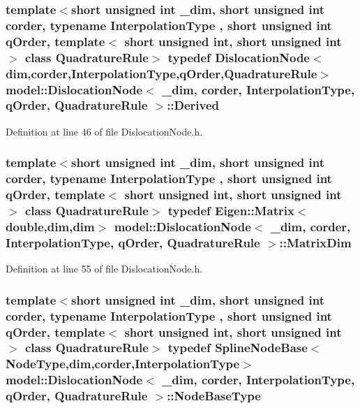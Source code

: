 \subsubsection[{Derived}]{\setlength{\rightskip}{0pt plus 5cm}template$<$short unsigned int \+\_\+dim, short unsigned int corder, typename Interpolation\+Type , short unsigned int q\+Order, template$<$ short unsigned int, short unsigned int $>$ class Quadrature\+Rule$>$ typedef {\bf Dislocation\+Node}$<${\bf dim},corder,Interpolation\+Type,q\+Order,Quadrature\+Rule$>$ {\bf model\+::\+Dislocation\+Node}$<$ \+\_\+dim, corder, Interpolation\+Type, q\+Order, Quadrature\+Rule $>$\+::{\bf Derived}}\label{classmodel_1_1_dislocation_node_a8897d6a9187952a267bb5a539dd69beb}


Definition at line 46 of file Dislocation\+Node.\+h.

\hypertarget{classmodel_1_1_dislocation_node_a7de028e95588e033ed38538bd2e77a51}{}
\subsubsection[{Matrix\+Dim}]{\setlength{\rightskip}{0pt plus 5cm}template$<$short unsigned int \+\_\+dim, short unsigned int corder, typename Interpolation\+Type , short unsigned int q\+Order, template$<$ short unsigned int, short unsigned int $>$ class Quadrature\+Rule$>$ typedef Eigen\+::\+Matrix$<$double,{\bf dim},{\bf dim}$>$ {\bf model\+::\+Dislocation\+Node}$<$ \+\_\+dim, corder, Interpolation\+Type, q\+Order, Quadrature\+Rule $>$\+::{\bf Matrix\+Dim}}\label{classmodel_1_1_dislocation_node_a7de028e95588e033ed38538bd2e77a51}


Definition at line 55 of file Dislocation\+Node.\+h.

\hypertarget{classmodel_1_1_dislocation_node_a1266b6e427448fc1fdac3e926837d802}{}
\subsubsection[{Node\+Base\+Type}]{\setlength{\rightskip}{0pt plus 5cm}template$<$short unsigned int \+\_\+dim, short unsigned int corder, typename Interpolation\+Type , short unsigned int q\+Order, template$<$ short unsigned int, short unsigned int $>$ class Quadrature\+Rule$>$ typedef {\bf Spline\+Node\+Base}$<${\bf Node\+Type},{\bf dim},corder,Interpolation\+Type$>$ {\bf model\+::\+Dislocation\+Node}$<$ \+\_\+dim, corder, Interpolation\+Type, q\+Order, Quadrature\+Rule $>$\+::{\bf Node\+Base\+Type}}\label{classmodel_1_1_dislocation_node_a1266b6e427448fc1fdac3e926837d802}


